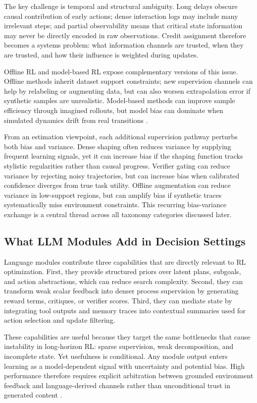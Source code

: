 \documentclass[pdflatex,sn-mathphys-num]{sn-jnl}
\begin{document}
The key challenge is temporal and structural ambiguity. Long delays obscure causal contribution of early actions; dense interaction logs may include many irrelevant steps; and partial observability means that critical state information may never be directly encoded in raw observations. Credit assignment therefore becomes a systems problem: what information channels are trusted, when they are trusted, and how their influence is weighted during updates.

Offline RL and model-based RL expose complementary versions of this issue. Offline methods inherit dataset support constraints; new supervision channels can help by relabeling or augmenting data, but can also worsen extrapolation error if synthetic samples are unrealistic. Model-based methods can improve sample efficiency through imagined rollouts, but model bias can dominate when simulated dynamics drift from real transitions \cite{arxiv_p_2301_12050,arxiv_p_2602_02454,arxiv_p_2602_11075,arxiv_p_2602_00785}.

From an estimation viewpoint, each additional supervision pathway perturbs both bias and variance. Dense shaping often reduces variance by supplying frequent learning signals, yet it can increase bias if the shaping function tracks stylistic regularities rather than causal progress. Verifier gating can reduce variance by rejecting noisy trajectories, but can increase bias when calibrated confidence diverges from true task utility. Offline augmentation can reduce variance in low-support regions, but can amplify bias if synthetic traces systematically miss environment constraints. This recurring bias-variance exchange is a central thread across all taxonomy categories discussed later.

\subsection{What LLM Modules Add in Decision Settings}
Language modules contribute three capabilities that are directly relevant to RL optimization. First, they provide structured priors over latent plans, subgoals, and action abstractions, which can reduce search complexity. Second, they can transform weak scalar feedback into denser process supervision by generating reward terms, critiques, or verifier scores. Third, they can mediate state by integrating tool outputs and memory traces into contextual summaries used for action selection and update filtering.

These capabilities are useful because they target the same bottlenecks that cause instability in long-horizon RL: sparse supervision, weak decomposition, and incomplete state. Yet usefulness is conditional. Any module output enters learning as a model-dependent signal with uncertainty and potential bias. High performance therefore requires explicit arbitration between grounded environment feedback and language-derived channels rather than unconditional trust in generated content \cite{arxiv_p_2602_06493,arxiv_p_2602_12579,arxiv_p_2601_06845,arxiv_p_2601_22511}.
\end{document}

